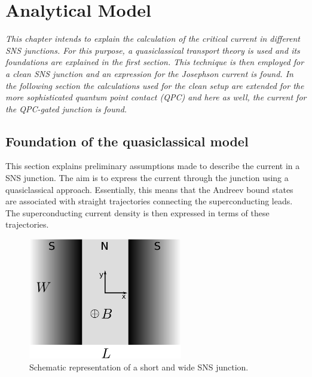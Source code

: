 \chapter{Analytical Model}
\label{ch:analyticalmodel}
\textit{This chapter intends to explain the calculation of the critical current in different SNS junctions. For this purpose, a quasiclassical transport theory is used and its foundations are explained in the first section. This technique is then employed for a clean SNS junction and an expression for the Josephson current is found. In the following section the calculations used for the clean setup are extended for the more sophisticated quantum point contact (QPC) and here as well, the current for the QPC-gated junction is found.}

\section{Foundation of the quasiclassical model}
This section explains preliminary assumptions made to describe the current in a SNS junction. The aim is to express the current through the junction using a quasiclassical approach. Essentially, this means that the Andreev bound states are associated with straight trajectories connecting the superconducting leads. The superconducting current density is then expressed in terms of these trajectories.\\
\begin{figure}[h]
\centering	
\includegraphics[width=0.6\textwidth]{figure/analyticalmodel/sns_junction}
\caption{Schematic representation of a short and wide SNS junction.}
\label{fig:sns_schematic}
\end{figure}

